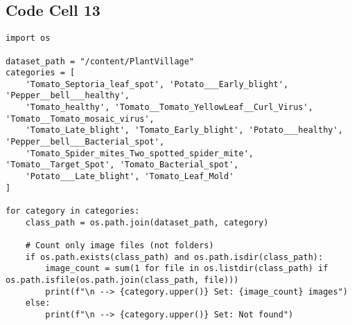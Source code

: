 \documentclass{article}
\begin{document}
\subsection*{Code Cell 13}
\begin{lstlisting}
import os

dataset_path = "/content/PlantVillage"
categories = [
    'Tomato_Septoria_leaf_spot', 'Potato___Early_blight', 'Pepper__bell___healthy',
    'Tomato_healthy', 'Tomato__Tomato_YellowLeaf__Curl_Virus', 'Tomato__Tomato_mosaic_virus',
    'Tomato_Late_blight', 'Tomato_Early_blight', 'Potato___healthy', 'Pepper__bell___Bacterial_spot',
    'Tomato_Spider_mites_Two_spotted_spider_mite', 'Tomato__Target_Spot', 'Tomato_Bacterial_spot',
    'Potato___Late_blight', 'Tomato_Leaf_Mold'
]

for category in categories:
    class_path = os.path.join(dataset_path, category)

    # Count only image files (not folders)
    if os.path.exists(class_path) and os.path.isdir(class_path):
        image_count = sum(1 for file in os.listdir(class_path) if os.path.isfile(os.path.join(class_path, file)))
        print(f"\n --> {category.upper()} Set: {image_count} images")
    else:
        print(f"\n --> {category.upper()} Set: Not found")

\end{lstlisting}
\end{document}
